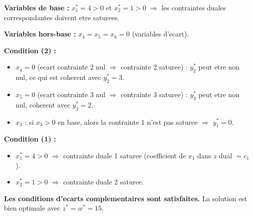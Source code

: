 \documentclass[12pt,a4paper]{article}
\begin{document}
\begin{correction}
\textbf{Variables de base :} $x_1^* = 4 > 0$ et $x_2^* = 1 > 0$ $\Rightarrow$ les contraintes duales correspondantes doivent etre saturees.

\textbf{Variables hors-base :} $x_4 = x_5 = x_6 = 0$ (variables d'ecart).

\textbf{Condition (2) :}
\begin{itemize}
    \item $x_4 = 0$ (ecart contrainte 2 nul $\Rightarrow$ contrainte 2 saturee) : $y_2^*$ peut etre non nul, ce qui est coherent avec $y_2^* = 3$.
    \item $x_5 = 0$ (ecart contrainte 3 nul $\Rightarrow$ contrainte 3 saturee) : $y_3^*$ peut etre non nul, coherent avec $y_3^* = 2$.
    \item $x_3$ : si $x_3 > 0$ en base, alors la contrainte 1 n'est pas saturee $\Rightarrow$ $y_1^* = 0$. \checkmark
\end{itemize}

\textbf{Condition (1) :}
\begin{itemize}
    \item $x_1^* = 4 > 0$ $\Rightarrow$ contrainte duale 1 saturee (coefficient de $x_1$ dans $z$ dual $= c_1$).
    \item $x_2^* = 1 > 0$ $\Rightarrow$ contrainte duale 2 saturee.
\end{itemize}

\textcolor{defvert}{\textbf{Les conditions d'ecarts complementaires sont satisfaites.}} La solution est bien optimale avec $z^* = w^* = 15$.
\end{correction}
\end{document}
